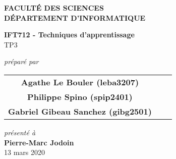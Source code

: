 \documentclass[letterpaper, 12pt]{article}
\begin{document}
    \begin{titlepage}
        \begin{center}
            \begin{large}
                \textbf{FACULTÉ DES SCIENCES} \\
                \textbf{DÉPARTEMENT D'INFORMATIQUE}
            \end{large}
            \vfill
            \begin{Large}
                \textbf{IFT712 - Techniques d'apprentissage} \\
                TP3
            \end{Large}
            \vfill
            \textit{préparé par} \\
            \begin{tabular}{ccc}
                \textbf{Agathe Le Bouler (leba3207)} \\
                \textbf{Philippe Spino (spip2401)} \\
                \textbf{Gabriel Gibeau Sanchez (gibg2501)}\\
            \end{tabular}
            \vfill
            \textit{présenté à} \\
            \textbf{Pierre-Marc Jodoin} \\
            \vfill
            13 mars 2020
        \end{center}
    \end{titlepage}
    \pagebreak
    
    
    \pagebreak
    
    \renewcommand{\figurename}{Figure}
    \renewcommand{\cftfigpresnum}{Figure }
    \renewcommand{\cftfignumwidth}{2cm}
%    
    \renewcommand{\tablename}{Tableau}
    \renewcommand{\cfttabpresnum}{Tableau }
    \renewcommand{\cfttabnumwidth}{2cm}
    
    
    
    \pagebreak
    
        
    \pagebreak
    
    \singlespacing
    \renewcommand{\refname}{Bibliographie}
    
    
\end{document}
